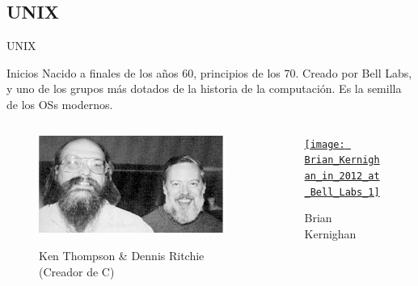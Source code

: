 \documentclass[12pt]{beamer}
\begin{document}
\subsection{UNIX}
\begin{frame}{UNIX}
	\begin{block}{Inicios}
		Nacido a finales de los años 60, principios de los 70. Creado por Bell Labs, y uno de los grupos más dotados de la historia de la computación. Es la semilla de los OSs modernos.
	\end{block}
	\begin{columns}
		\begin{column}{0.5\textwidth}
			\begin{figure}
				\centering
				\href{http://cat-v.org/}{\includegraphics[width=\linewidth]{Ken-Thompson-og-Dennis-Ritchie}}
				\caption{Ken Thompson \& Dennis Ritchie (Creador de C)}
				\label{fig:ken-thompson-og-dennis-ritchie}
			\end{figure}
		\end{column}
		\begin{column}{0.5\textwidth}
			\begin{figure}
				\centering
				\href{https://www.youtube.com/watch?v=QFK6RG47bww&list=PLzH6n4zXuckqZ90zLyy36qjO5YIn1RulG}{\texttt{[image: Brian\_Kernighan\_in\_2012\_at\_Bell\_Labs\_1]}}
				\caption{Brian Kernighan}
				\label{fig:briankernighanin2012atbelllabs1}
			\end{figure}
		\end{column}
	\end{columns}
	
\end{frame}
\end{document}
